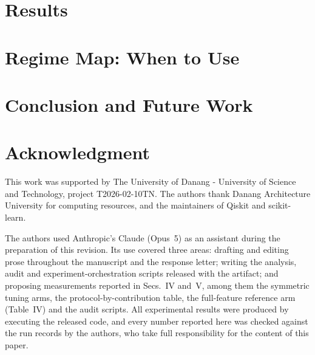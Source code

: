 \section{Results}
\label{sec:results}


\section{Regime Map: When to Use \QSVM{}}
\label{sec:regimemap}



\section{Conclusion and Future Work}
\label{sec:conclusion}




\section*{Acknowledgment}
This work was supported by The University of Danang - University of Science
and Technology, project T2026-02-10TN. The authors thank Danang Architecture
University for computing resources, and the maintainers of Qiskit and
scikit-learn.
\begin{revbody}
The authors used Anthropic's Claude (Opus~5) as an assistant during the
preparation of this revision. Its use covered three areas: drafting and editing
prose throughout the manuscript and the response letter; writing the analysis,
audit and experiment-orchestration scripts released with the artifact; and
proposing measurements reported in Secs.~IV and~V, among them the symmetric
tuning arms, the protocol-by-contribution table, the full-feature reference arm
(Table~IV) and the audit scripts. All experimental results were produced by
executing the released code, and every number reported here was checked
against the run records by the authors, who take full responsibility for the
content of this paper.
\end{revbody}

